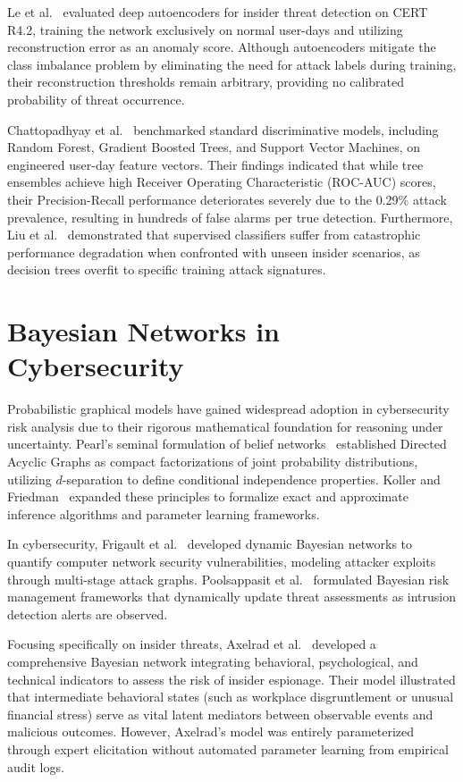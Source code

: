 \documentclass[12pt,a4paper]{report}
\begin{document}
Le et al.~\cite{le2020deep} evaluated deep autoencoders for insider threat detection on CERT R4.2, training the network exclusively on normal user-days and utilizing reconstruction error as an anomaly score. Although autoencoders mitigate the class imbalance problem by eliminating the need for attack labels during training, their reconstruction thresholds remain arbitrary, providing no calibrated probability of threat occurrence.

Chattopadhyay et al.~\cite{chattopadhyay2020time} benchmarked standard discriminative models, including Random Forest, Gradient Boosted Trees, and Support Vector Machines, on engineered user-day feature vectors. Their findings indicated that while tree ensembles achieve high Receiver Operating Characteristic (ROC-AUC) scores, their Precision-Recall performance deteriorates severely due to the 0.29\% attack prevalence, resulting in hundreds of false alarms per true detection. Furthermore, Liu et al.~\cite{liu2018insider} demonstrated that supervised classifiers suffer from catastrophic performance degradation when confronted with unseen insider scenarios, as decision trees overfit to specific training attack signatures.

\section{Bayesian Networks in Cybersecurity}
Probabilistic graphical models have gained widespread adoption in cybersecurity risk analysis due to their rigorous mathematical foundation for reasoning under uncertainty. Pearl's seminal formulation of belief networks~\cite{pearl1988probabilistic} established Directed Acyclic Graphs as compact factorizations of joint probability distributions, utilizing $d$-separation to define conditional independence properties. Koller and Friedman~\cite{koller2009probabilistic} expanded these principles to formalize exact and approximate inference algorithms and parameter learning frameworks.

In cybersecurity, Frigault et al.~\cite{frigault2008measuring} developed dynamic Bayesian networks to quantify computer network security vulnerabilities, modeling attacker exploits through multi-stage attack graphs. Poolsappasit et al.~\cite{poolsappasit2012dynamic} formulated Bayesian risk management frameworks that dynamically update threat assessments as intrusion detection alerts are observed. 

Focusing specifically on insider threats, Axelrad et al.~\cite{axelrad2013bayesian} developed a comprehensive Bayesian network integrating behavioral, psychological, and technical indicators to assess the risk of insider espionage. Their model illustrated that intermediate behavioral states (such as workplace disgruntlement or unusual financial stress) serve as vital latent mediators between observable events and malicious outcomes. However, Axelrad's model was entirely parameterized through expert elicitation without automated parameter learning from empirical audit logs.
\end{document}
